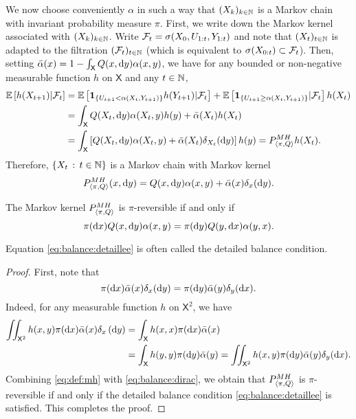 \documentclass[english,graybox,envcountchap,envcountsame,sectrefs,shortlabels]{svmono}
\theoremstyle{style}
\newcommand{\Xset}{\mathsf{X}}
\begin{document}
We now choose conveniently $\alpha$ in such a way that $(X_{k})_{k\in\mathbb{N}}$
is a Markov chain with invariant probability measure $\pi$. 
First, we write down the Markov kernel associated with $(X_{k})_{k\in\mathbb{N}}$. Write $\mathcal{F}_{t}=\sigma(X_{0},U_{1:t},Y_{1:t})$
and note that $(X_{t})_{t\in\mathbb{N}}$ is adapted to the filtration $(\mathcal{F}_{t})_{t\in\mathbb{N}}$
(which is equivalent to $\sigma(X_{0:t})\subset\mathcal{F}_{t}$). Then,
setting $\bar{\alpha}(x)=1-\int_{\Xset}Q(x,\rmd y)\alpha(x,y)$, we
have for any bounded or non-negative measurable function $h$ on $\Xset$
and any $t\in\mathbb{N}$,
\begin{align*}
\PE\lrb{h(X_{t+1})|\mcf_{t}} & =\PE\lrb{\indiacc{U_{t+1}<\alpha(X_{t},Y_{t+1})}h(Y_{t+1})|\mcf_{t}}+\PE\lrb{\indiacc{U_{t+1}\geq\alpha(X_{t},Y_{t+1})}|\mcf_{t}}h(X_{t})\\
 & =\int_{\Xset}Q(X_{t},\rmd y)\alpha(X_{t},y)h(y)+\bar{\alpha}(X_{t})h(X_{t})\\
 & =\int_{\Xset}\lrb{Q(X_{t},\rmd y)\alpha(X_{t},y)+\bar{\alpha}(X_{t})\delta_{X_{t}}(\rmd y)}h(y)=\mh{\pi,Q}h(X_{t}).
\end{align*}
Therefore, $\left\{ X_{t}\,:\,t\in\mathbb{N}\right\}$ is a Markov chain with Markov
kernel
\begin{equation}
P_{\langle\pi,Q\rangle}^{MH}(x,\mathrm{d} y)=Q(x,\mathrm{d} y)\alpha(x,y)+\bar{\alpha}(x)\delta_{x}(\mathrm{d} y).\label{eq:def:mh}
\end{equation}

\begin{lemma}
\label{lem:reversible} The Markov kernel $P_{\langle\pi,Q\rangle}^{MH}$ is $\pi$-reversible
if and only if
\begin{equation}
\pi(\mathrm{d} x)Q(x,\mathrm{d} y)\alpha(x,y)=\pi(\mathrm{d} y)Q(y,\mathrm{d} x)\alpha(y,x).\label{eq:balance:detaillee}
\end{equation}
\end{lemma}
Equation \eqref{eq:balance:detaillee} is often called
the detailed balance condition.
\begin{proof}
First, note that
\begin{equation}
\pi(\mathrm{d} x)\bar{\alpha}(x)\delta_{x}(\mathrm{d} y)=\pi(\mathrm{d} y)\bar{\alpha}(y)\delta_{y}(\mathrm{d} x).\label{eq:balance:dirac}
\end{equation}
Indeed, for any measurable function $h$ on $\Xset^{2}$, we have
\begin{align*}
\iint_{\Xset^{2}}h(x,y)\pi(\rmd x)\bar{\alpha}(x)\delta_{x}\lr{\rmd y} & =\int_{\Xset}h(x,x)\pi(\rmd x)\bar{\alpha}(x)\\
 & =\int_{\Xset}h(y,y)\pi(\rmd y)\bar{\alpha}(y)=\iint_{\Xset^{2}}h(x,y)\pi(\rmd y)\bar{\alpha}(y)\delta_{y}(\rmd x).
\end{align*}
Combining \eqref{eq:def:mh} with \eqref{eq:balance:dirac}, we obtain that
$P_{\langle\pi,Q\rangle}^{MH}$ is $\pi$-reversible if and only if the detailed balance
condition \eqref{eq:balance:detaillee} is satisfied. This completes
the proof.
\end{proof}
\end{document}
